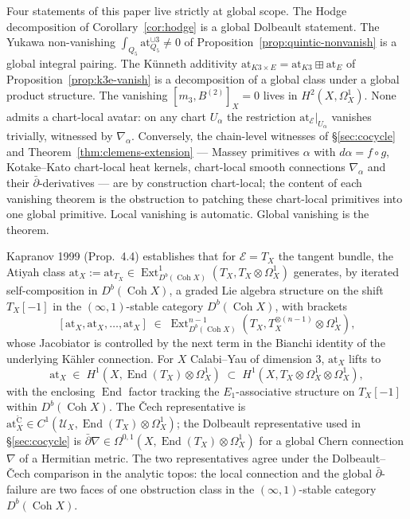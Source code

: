 \documentclass[11pt,reqno]{amsart}
\theoremstyle{plain}
\theoremstyle{definition}
\theoremstyle{remark}
\DeclareMathOperator{\Ext}{Ext}
\DeclareMathOperator{\End}{End}
\DeclareMathOperator{\Coh}{Coh}
\newcommand{\cU}{\mathcal{U}}
\newcommand{\cE}{\mathcal{E}}
\newcommand{\at}{\mathrm{at}}
\begin{document}
Four statements of this paper live strictly at global scope. The Hodge decomposition of Corollary~\ref{cor:hodge} is a global Dolbeault statement. The Yukawa non-vanishing $\int_{Q_5} \at_{Q_5}^{\cup 3} \neq 0$ of Proposition~\ref{prop:quintic-nonvanish} is a global integral pairing. The Künneth additivity $\at_{K3 \times E} = \at_{K3} \boxplus \at_E$ of Proposition~\ref{prop:k3e-vanish} is a decomposition of a global class under a global product structure. The vanishing $[m_3, B^{(2)}]_X = 0$ lives in $H^2(X, \Omega^1_X)$. None admits a chart-local avatar: on any chart $U_\alpha$ the restriction $\at_\cE|_{U_\alpha}$ vanishes trivially, witnessed by $\nabla_\alpha$. Conversely, the chain-level witnesses of §\ref{sec:cocycle} and Theorem~\ref{thm:clemens-extension} --- Massey primitives $\alpha$ with $d\alpha = f \circ g$, Kotake--Kato chart-local heat kernels, chart-local smooth connections $\nabla_\alpha$ and their $\bar\partial$-derivatives --- are by construction chart-local; the content of each vanishing theorem is the obstruction to patching these chart-local primitives into one global primitive. Local vanishing is automatic. Global vanishing is the theorem.

Kapranov 1999 (Prop.~4.4) establishes that for $\cE = T_X$ the tangent bundle, the Atiyah class $\at_X := \at_{T_X} \in \Ext^1_{D^b(\Coh X)}(T_X, T_X \otimes \Omega^1_X)$ generates, by iterated self-composition in $D^b(\Coh X)$, a graded Lie algebra structure on the shift $T_X[-1]$ in the $(\infty,1)$-stable category $D^b(\Coh X)$, with brackets
\[
  [\at_X, \at_X, \ldots, \at_X] \;\in\; \Ext^{n-1}_{D^b(\Coh X)}(T_X, T_X^{\otimes (n-1)} \otimes \Omega^1_X),
\]
whose Jacobiator is controlled by the next term in the Bianchi identity of the underlying Kähler connection. For $X$ Calabi--Yau of dimension $3$, $\at_X$ lifts to
\[
  \at_X \;\in\; H^1(X, \End(T_X) \otimes \Omega^1_X) \;\subset\; H^1(X, T_X \otimes \Omega^1_X \otimes \Omega^1_X),
\]
with the enclosing $\End$ factor tracking the $E_1$-associative structure on $T_X[-1]$ within $D^b(\Coh X)$. The Čech representative is $\at_X^{\check{\mathrm C}} \in C^1(\cU_X, \End(T_X) \otimes \Omega^1_X)$; the Dolbeault representative used in §\ref{sec:cocycle} is $\bar\partial \nabla \in \Omega^{0,1}(X, \End(T_X) \otimes \Omega^1_X)$ for a global Chern connection $\nabla$ of a Hermitian metric. The two representatives agree under the Dolbeault--Čech comparison in the analytic topos: the local connection and the global $\bar\partial$-failure are two faces of one obstruction class in the $(\infty,1)$-stable category $D^b(\Coh X)$.
\end{document}
